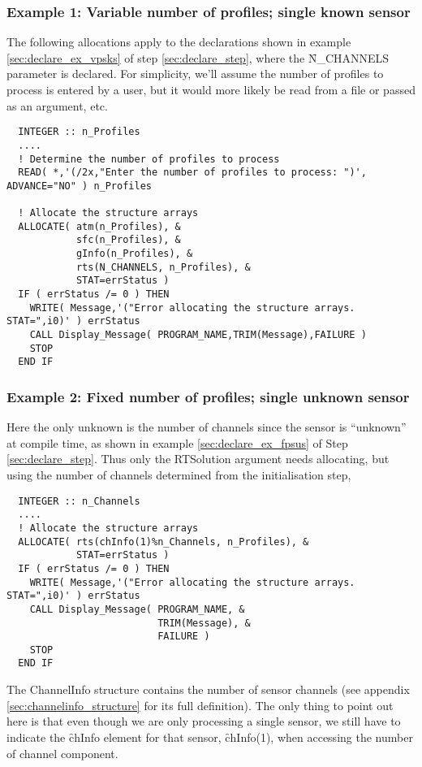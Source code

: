 \subsubsection{Example 1: Variable number of profiles; single known sensor}
The following allocations apply to the declarations shown in example \ref{sec:declare_ex_vpsks} of step \ref{sec:declare_step}, where the \f{N\_CHANNELS} parameter is declared. For simplicity, we'll assume the number of profiles to process is entered by a user, but it would more likely be read from a file or passed as an argument, etc.
\begin{ttfamily}
  \begin{verbatim}
  INTEGER :: n_Profiles
  ....
  ! Determine the number of profiles to process
  READ( *,'(/2x,"Enter the number of profiles to process: ")', ADVANCE="NO" ) n_Profiles
  
  ! Allocate the structure arrays
  ALLOCATE( atm(n_Profiles), &
            sfc(n_Profiles), &
            gInfo(n_Profiles), &
            rts(N_CHANNELS, n_Profiles), &
            STAT=errStatus )
  IF ( errStatus /= 0 ) THEN 
    WRITE( Message,'("Error allocating the structure arrays. STAT=",i0)' ) errStatus
    CALL Display_Message( PROGRAM_NAME,TRIM(Message),FAILURE )
    STOP
  END IF\end{verbatim}
\end{ttfamily}

\subsubsection{Example 2: Fixed number of profiles; single unknown sensor}
Here the only unknown is the number of channels since the sensor is ``unknown'' at compile time, as shown in example \ref{sec:declare_ex_fpsus} of Step \ref{sec:declare_step}. Thus only the RTSolution argument needs allocating, but using the number of channels determined from the initialisation step,
\begin{ttfamily}
  \begin{verbatim}
  INTEGER :: n_Channels
  ....
  ! Allocate the structure arrays
  ALLOCATE( rts(chInfo(1)%n_Channels, n_Profiles), &
            STAT=errStatus )
  IF ( errStatus /= 0 ) THEN 
    WRITE( Message,'("Error allocating the structure arrays. STAT=",i0)' ) errStatus
    CALL Display_Message( PROGRAM_NAME, &
                          TRIM(Message), & 
                          FAILURE )
    STOP
  END IF\end{verbatim}
\end{ttfamily}
The ChannelInfo structure contains the number of sensor channels (see appendix \ref{sec:channelinfo_structure} for its full definition). The only thing to point out here is that even though we are only processing a single sensor, we still have to indicate the \f{chInfo} element for that sensor, \f{chInfo(1)}, when accessing the number of channel component.


